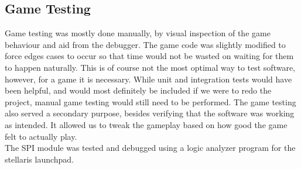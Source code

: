 \subsection{Game Testing}
Game testing was mostly done manually, by visual inspection of the game behaviour and
aid from the debugger. The game code was slightly modified to force edges cases to
occur so that time would not be wasted on waiting for them to happen naturally.
 This is of course not the most optimal way to test software,
however, for a game it is necessary. While unit and integration tests would have been helpful, and
would most definitely be included if we were to redo the project, manual game
testing would still need to be performed. The game testing also served a 
secondary purpose, besides verifying that the software was working as intended.
It allowed us to tweak the gameplay based on how good the game felt to actually play. \\

The SPI module was tested and debugged using a logic analyzer program for the stellaris 
launchpad.
